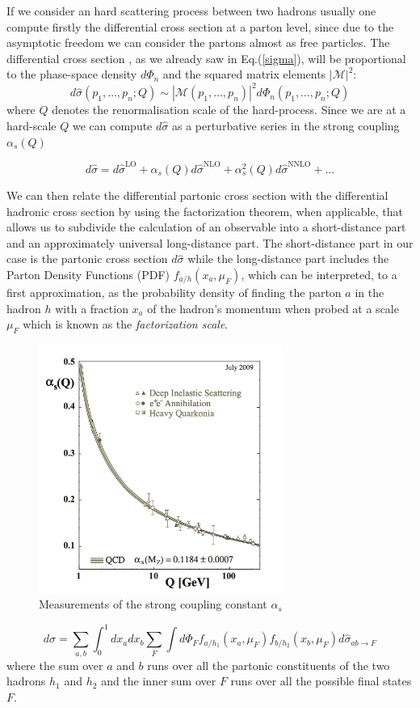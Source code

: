\documentclass[../main/main.tex]{subfiles}
\begin{document}
If we consider an hard scattering  process between two hadrons usually one compute firstly the differential cross section at a parton level, since due to the asymptotic freedom we can consider the partons almost as free particles.
The differential cross section , as we already saw in Eq.(\ref{sigma}), will be proportional to the phase-space density $d\Phi_n$ and the squared
matrix elements $|\mathcal{M}|^2$:
\begin{equation}
	d\hat{\sigma}(p_1,\dots, p_n; Q) \sim |\mathcal{M}(p_1,\dots, p_n)|^2 d\Phi_n(p_1,\dots, p_n; Q) 
\end{equation}
where $Q$ denotes the renormalisation scale of the hard-process. Since we are at a hard-scale $Q$ we can compute $d\hat{\sigma}$ as a 
perturbative series in the strong coupling  $\alpha_s(Q)$

\begin{equation}
	d\hat{\sigma} = d\hat{\sigma}^{\text{LO}} + \alpha_s(Q)  d\hat{\sigma}^{\text{NLO}} + \alpha^2_s(Q)  d\hat{\sigma}^{\text{NNLO}} + \dots
\end{equation}

We can then relate the differential partonic cross section with the differential hadronic cross section by using the factorization theorem, when 
applicable, that allows us to subdivide the calculation of an observable into a short-distance part and an approximately universal long-distance part.
The short-distance part in our case is the partonic cross section $d\hat{\sigma}$  while the long-distance part includes the Parton Density Functions (PDF) $f_{a/h}(x_a,\mu_F)$, which can be interpreted, to a first approximation,  as the probability density of finding the parton $a$ in the hadron $h$ with a 
fraction $x_a$ of the hadron's  momentum when probed at a scale $\mu_F$ which is known as the \emph{factorization scale}.
\begin{figure}[h]
	\centering
	\includegraphics[width=8cm]{../images/asymptotic_freedom.png}
	\caption{Measurements of the strong coupling constant $\alpha_s$}
	\label{alpha}
\end{figure}
\begin{equation}
	\label{QCD fact}
	d\sigma = \sum_{a,b}\int_0^1 dx_a dx_b \sum_F \int d\Phi_F f_{a/h_1}(x_a,\mu_F) f_{b/h_2}(x_b,\mu_F)  d\hat{\sigma}_{ab \rightarrow F}
\end{equation}
where the sum over $a$ and $b$ runs over all the partonic constituents of the two hadrons $h_1$ and $h_2$ and the inner sum over $F$ runs over all the possible final states $F$.
\end{document}
